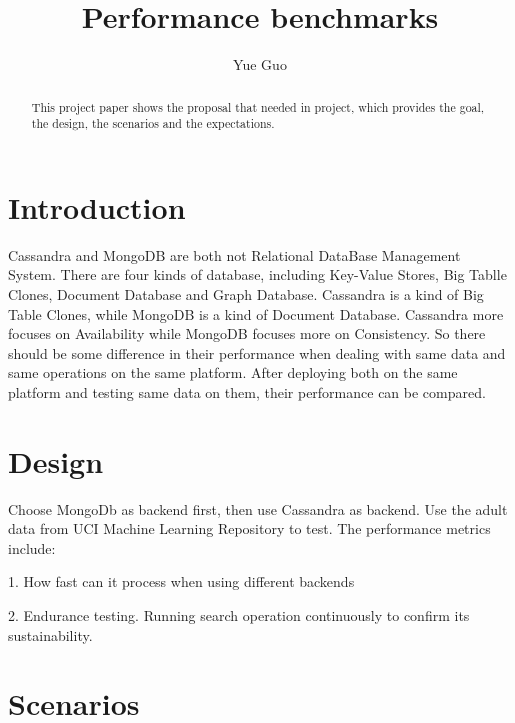 
\title{Performance benchmarks}

\author{Yue Guo}

\begin{abstract}
This project paper shows the proposal that needed in project, which provides the goal, the design, the scenarios and the expectations.
\end{abstract}



\maketitle


\section{Introduction}
Cassandra and MongoDB are both not Relational DataBase Management System. There are four kinds of database, including Key-Value Stores, Big Tablle Clones, Document Database and Graph Database. Cassandra is a kind of Big Table Clones, while MongoDB is a kind of Document Database. Cassandra more focuses on Availability while MongoDB focuses more on Consistency. So there should be some difference in their performance when dealing with same data and same operations on the same platform. After deploying both on the same platform and testing same data on them, their performance can be compared.


\section{Design}
Choose MongoDb as backend first, then use Cassandra as backend. Use the adult data from UCI Machine Learning Repository to test. The performance metrics include: 

1. How fast can it process when using different backends

2. Endurance testing. Running search operation continuously to confirm its sustainability.

\section{Scenarios}

